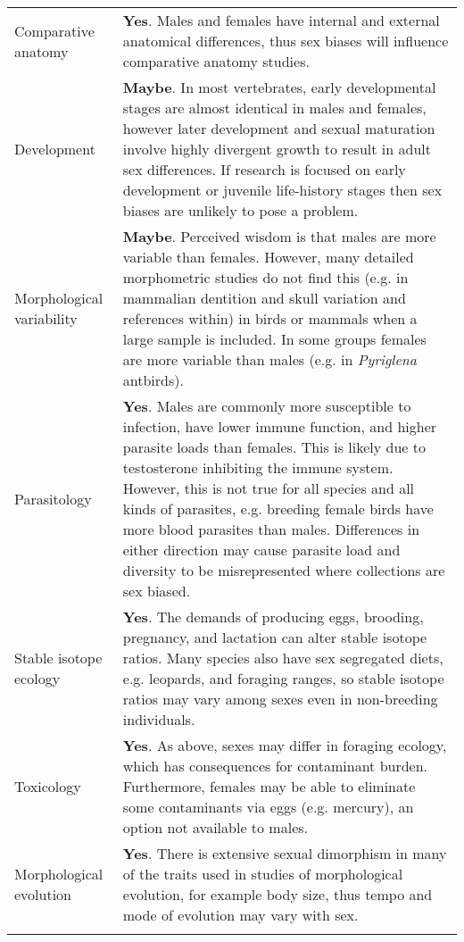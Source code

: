 \begin{longtable}{p{3cm} p{16cm}}
  Comparative anatomy & \textbf{Yes}. Males and females have internal and external anatomical differences, thus sex biases will influence comparative anatomy studies.\\ 

  Development & \textbf{Maybe}. In most vertebrates, early developmental stages are almost identical in males and females, however later development and sexual maturation involve highly divergent growth to result in adult sex differences\cite{badyaev2002growing}. If research is focused on early development or juvenile life-history stages then sex biases are unlikely to pose a problem.\\

  Morphological variability & \textbf{Maybe}. Perceived wisdom is that males are more variable than females. However, many detailed morphometric studies do not find this (e.g. in mammalian dentition and skull variation\cite{polly1998variability,biswas2019} and references within) in birds or mammals when a large sample is included. In some groups females are more variable than males (e.g. in \textit{Pyriglena} antbirds\cite{isler2017calls}).\\ 

  Parasitology & \textbf{Yes}. Males are commonly more susceptible to infection, have lower immune function, and higher parasite loads than females\cite{zuk2009sicker}. This is likely due to testosterone inhibiting the immune system\cite{Klein:2016aa}. However, this is not true for all species and all kinds of parasites, e.g. breeding female birds have more blood parasites than males\cite{mccurdy1998sex}. Differences in either direction may cause parasite load and diversity to be misrepresented where collections are sex biased.\\ 

  Stable isotope ecology & \textbf{Yes}. The demands of producing eggs, brooding, pregnancy, and lactation can alter stable isotope ratios\cite{fuller2004nitrogen}. Many species also have sex segregated diets, e.g. leopards\cite{voigt2018sex}, and foraging ranges, so stable isotope ratios may vary among sexes even in non-breeding individuals.\\ 

  Toxicology & \textbf{Yes}. As above, sexes may differ in foraging ecology, which has consequences for contaminant burden. Furthermore, females may be able to eliminate some contaminants via eggs (e.g. mercury\cite{robinson2012sex}), an option not available to males.\\ 
  Morphological evolution & \textbf{Yes}. There is extensive sexual dimorphism in many of the traits used in studies of morphological evolution, for example body size\cite{Uyeda15908}, thus tempo and mode of evolution may vary with sex.\\ 

  \hline
\label{table_consequences}
\end{longtable}

